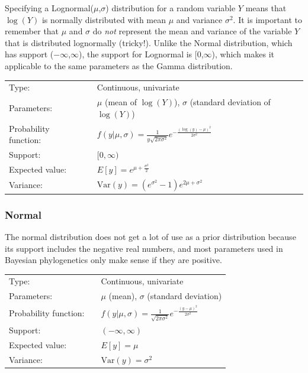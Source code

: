 \documentclass[10pt]{article}
\newcommand{\Var}{\mbox{Var}}
\begin{document}
Specifying a Lognormal($\mu$,$\sigma$) distribution for a random variable $Y$ means that $\log(Y)$ is normally distributed with mean $\mu$ and variance $\sigma^2$. It is important to remember that $\mu$ and $\sigma$ do {\em not} represent the mean and variance of the variable $Y$ that is distributed lognormally (tricky!). Unlike the Normal distribution, which has support ($-\infty$,$\infty$), the support for Lognormal is [0,$\infty$), which makes it applicable to the same parameters as the Gamma distribution.

\begin{tabular}{lcl}
Type:                 & & Continuous, univariate \\
Parameters:           & & $\mu$ (mean of $\log(Y)$), $\sigma$ (standard deviation of $\log(Y)$)    \\
Probability function: & & $f(y|\mu,\sigma) = \frac{1}{y \sqrt{2 \pi \sigma^2}} e^{-\frac{(\log(y)-\mu)^2}{2 \sigma^2}}$ \\
Support:              & & $[0,\infty)$     \\
Expected value:       & & $E[y] = e^{\mu + \frac{\sigma^2}{2}}$ \\
Variance:             & & $\Var(y) = \left( e^{\sigma^2} - 1 \right) e^{2 \mu + \sigma^2}$ 
\end{tabular}

\subsubsection{Normal}

The normal distribution does not get a lot of use as a prior distribution because its support includes the negative real numbers, and most parameters used in Bayesian phylogenetics only make sense if they are positive.

\begin{tabular}{lcl}
Type:                 & & Continuous, univariate \\
Parameters:           & & $\mu$ (mean), $\sigma$ (standard deviation)    \\
Probability function: & & $f(y|\mu,\sigma) = \frac{1}{\sqrt{2 \pi \sigma^2}} e^{-\frac{(y-\mu)^2}{2 \sigma^2}}$ \\
Support:              & & $(-\infty,\infty)$     \\
Expected value:       & & $E[y] = \mu$ \\
Variance:             & & $\Var(y) = \sigma^2$ 
\end{tabular}
\end{document}
